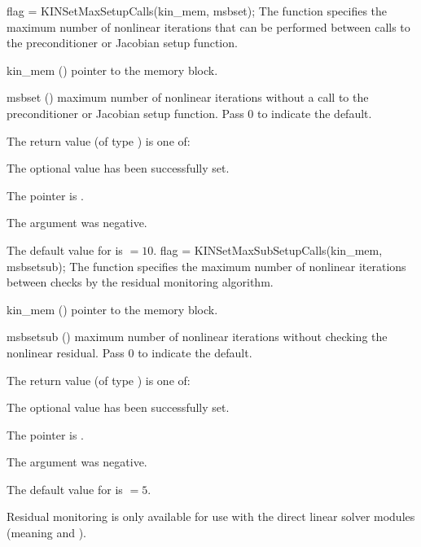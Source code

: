 {
flag = KINSetMaxSetupCalls(kin\_mem, msbset);
}
{
  The function  specifies the maximum number of 
  nonlinear iterations that can be performed between calls to the 
  preconditioner or Jacobian setup function.
}
{
  \begin{args}
  \item[kin\_mem] ()
    pointer to the {\kinsol} memory block.
  \item[msbset] ()
    maximum number of nonlinear iterations without a call to the
    preconditioner or Jacobian setup function.  Pass 0 to indicate the default.
  \end{args}
}
{
  The return value  (of type ) is one of:
  \begin{args}
  \item[\Id{KIN\_SUCCESS}] 
    The optional value has been successfully set.
  \item[\Id{KIN\_MEM\_NULL}]
    The  pointer is .
  \item[\Id{KIN\_ILL\_INPUT}]
    The argument  was negative.
  \end{args}
}
{
  The default value for  is  $=10$.
}
{
flag = KINSetMaxSubSetupCalls(kin\_mem, msbsetsub);
}
{
  The function  specifies the maximum number of 
  nonlinear iterations between checks by the residual monitoring algorithm.
}
{
  \begin{args}
  \item[kin\_mem] ()
    pointer to the {\kinsol} memory block.
  \item[msbsetsub] ()
    maximum number of nonlinear iterations without checking the
    nonlinear residual.  Pass 0 to indicate the default.
  \end{args}
}
{
  The return value  (of type ) is one of:
  \begin{args}
  \item[\Id{KIN\_SUCCESS}] 
    The optional value has been successfully set.
  \item[\Id{KIN\_MEM\_NULL}]
    The  pointer is .
  \item[\Id{KIN\_ILL\_INPUT}]
    The argument  was negative.
  \end{args}
}
{
  The default value for  is  $=5$.

  {\warn}Residual monitoring is only available for use with the direct linear solver
  modules (meaning {\kindense} and {\kinband}).
}

